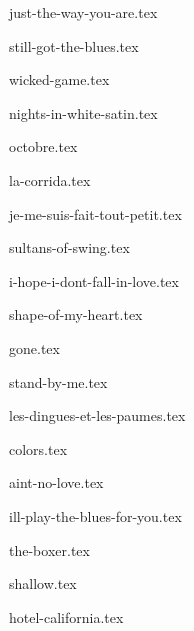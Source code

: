 \begin{songs}{}

  {just-the-way-you-are.tex}
  \sclearpage  
  
  {still-got-the-blues.tex}
  \sclearpage

  {wicked-game.tex}
  \sclearpage

  {nights-in-white-satin.tex}
  \sclearpage

  {octobre.tex}
  \sclearpage

  {la-corrida.tex}
  \sclearpage

  {je-me-suis-fait-tout-petit.tex}
  \sclearpage

  {sultans-of-swing.tex}
  \sclearpage

  {i-hope-i-dont-fall-in-love.tex}
  \sclearpage

  {shape-of-my-heart.tex}
  \sclearpage

  {gone.tex}
  \sclearpage

  {stand-by-me.tex}
  \sclearpage

  {les-dingues-et-les-paumes.tex}
  \sclearpage

  {colors.tex}
  \sclearpage

  {aint-no-love.tex}
  \sclearpage

  {ill-play-the-blues-for-you.tex}
  \sclearpage

  {the-boxer.tex}
  \sclearpage

  {shallow.tex}
  \sclearpage

  {hotel-california.tex}
  \sclearpage

 \end{songs}
